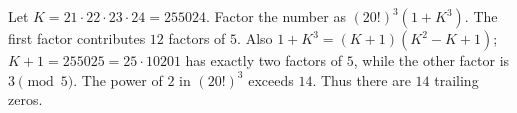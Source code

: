 Let $K=21\cdot22\cdot23\cdot24=255024$. Factor the number as $(20!)^3(1+K^3)$. The first factor contributes $12$ factors of $5$. Also $1+K^3=(K+1)(K^2-K+1)$; $K+1=255025=25\cdot10201$ has exactly two factors of $5$, while the other factor is $3\pmod5$. The power of $2$ in $(20!)^3$ exceeds $14$. Thus there are $\boxed{14}$ trailing zeros.
